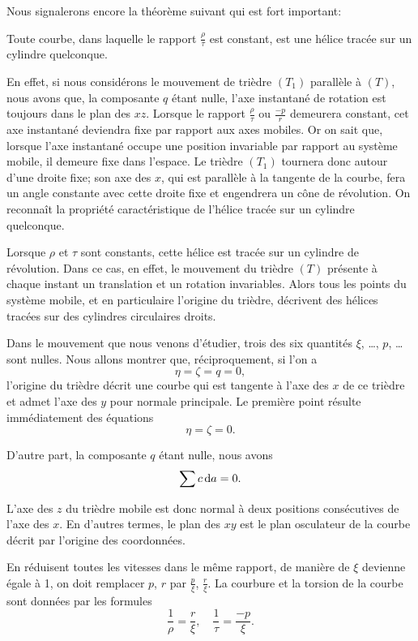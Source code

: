  Nous signalerons encore la théorème suivant qui est fort important:
\begin{thm}
	Toute courbe, dans laquelle le rapport $\frac\rho\tau$ est constant, est une hélice tracée sur un cylindre 
	quelconque.
\end{thm}

En effet, si nous considérons le mouvement de trièdre $(T_1)$ parallèle à $(T)$, nous avons que, la composante $q$ 
étant nulle, l'axe instantané de rotation est toujours dans le plan des $xz$. Lorsque le rapport $\frac\rho\tau$ ou 
$\frac{-p}{r}$ demeurera constant, cet axe instantané deviendra fixe par rapport aux axes mobiles. Or on sait que, 
lorsque l'axe instantané occupe une position invariable par rapport au système mobile, il demeure fixe dans l'espace. 
Le trièdre $(T_1)$ tournera donc autour d'une droite fixe; son axe des $x$, qui est parallèle à la tangente de la 
courbe, fera un angle constante avec cette droite fixe et engendrera un cône de révolution. On reconnaît la propriété 
caractéristique de l'hélice tracée sur un cylindre quelconque.

Lorsque $\rho$ et $\tau$ sont constants, cette hélice est tracée sur un cylindre de révolution. Dans ce cas, en effet, 
le mouvement du trièdre $(T)$ présente à chaque instant un translation et un rotation invariables. Alors tous les 
points du système mobile, et en particulaire l'origine du trièdre, décrivent des hélices tracées sur des cylindres 
circulaires droits.

 Dans le mouvement que nous venons d'étudier, trois des six quantités $\xi$, \ldots, $p$, \ldots sont 
nulles. Nous allons montrer que, réciproquement, si l'on a
\[
	\eta = \zeta = q = 0,
\]
l'origine du trièdre décrit une courbe qui est tangente à l'axe des $x$ de ce trièdre et admet l'axe des $y$ pour 
normale principale. Le première point résulte immédiatement des équations
\[
	\eta = \zeta = 0.
\]

D'autre part, la composante $q$ étant nulle, nous avons
\[
	\sum{c \ensuremath{\operatorname{d}\!{a}}} = 0.
\]

L'axe des $z$ du trièdre mobile est donc normal à deux positions consécutives de l'axe des $x$. En d'autres termes, le 
plan des $xy$ est le plan osculateur de la courbe décrit par l'origine des coordonnées.

En réduisent toutes les vitesses dans le même rapport, de manière de $\xi$ devienne égale à 1, on doit remplacer $p$, 
$r$ par $\frac{p}{\xi}$, $\frac{r}{\xi}$. La courbure et la torsion de la courbe sont données par les formules
\begin{equation}
	\frac{1}{\rho} = \frac{r}{\xi}, \quad \frac{1}{\tau} = \frac{-p}{\xi}.
	\label{eqn-1.16}
\end{equation}

